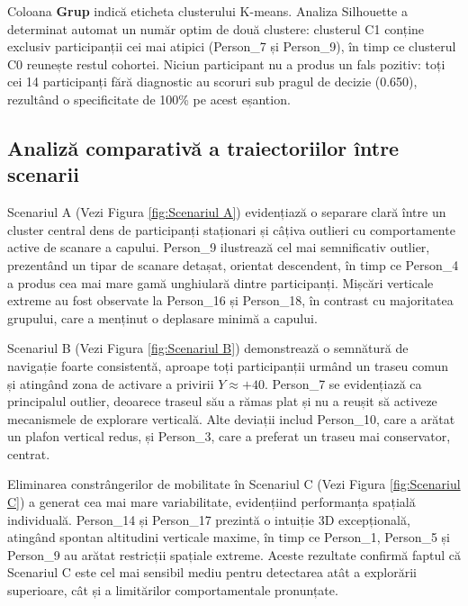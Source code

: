 \documentclass[12pt,a4paper]{report}
\theoremstyle{definition}
\theoremstyle{remark}
\begin{document}
\noindent Coloana \textbf{Grup} indică eticheta clusterului K-means. Analiza Silhouette a determinat automat un număr optim de două clustere: clusterul C1 conține exclusiv participanții cei mai atipici (Person\_7 și Person\_9), în timp ce clusterul C0 reunește restul cohortei. Niciun participant nu a produs un fals pozitiv: toți cei 14 participanți fără diagnostic au scoruri sub pragul de decizie (0.650), rezultând o specificitate de 100\% pe acest eșantion.

\subsection{Analiză comparativă a traiectoriilor între scenarii}

Scenariul A (Vezi Figura \ref{fig:Scenariul A}) evidențiază o separare clară între un cluster central dens de participanți staționari și câțiva outlieri cu comportamente active de scanare a capului. Person\_9 ilustrează cel mai semnificativ outlier, prezentând un tipar de scanare detașat, orientat descendent, în timp ce Person\_4 a produs cea mai mare gamă unghiulară dintre participanți. Mișcări verticale extreme au fost observate la Person\_16 și Person\_18, în contrast cu majoritatea grupului, care a menținut o deplasare minimă a capului.

Scenariul B (Vezi Figura \ref{fig:Scenariul B}) demonstrează o semnătură de navigație foarte consistentă, aproape toți participanții urmând un traseu comun și atingând zona de activare a privirii $Y \approx +40$. Person\_7 se evidențiază ca principalul outlier, deoarece traseul său a rămas plat și nu a reușit să activeze mecanismele de explorare verticală. Alte deviații includ Person\_10, care a arătat un plafon vertical redus, și Person\_3, care a preferat un traseu mai conservator, centrat.

Eliminarea constrângerilor de mobilitate în Scenariul C (Vezi Figura \ref{fig:Scenariul C}) a generat cea mai mare variabilitate, evidențiind performanța spațială individuală. Person\_14 și Person\_17 prezintă o intuiție 3D excepțională, atingând spontan altitudini verticale maxime, în timp ce Person\_1, Person\_5 și Person\_9 au arătat restricții spațiale extreme. Aceste rezultate confirmă faptul că Scenariul C este cel mai sensibil mediu pentru detectarea atât a explorării superioare, cât și a limitărilor comportamentale pronunțate.
\end{document}
